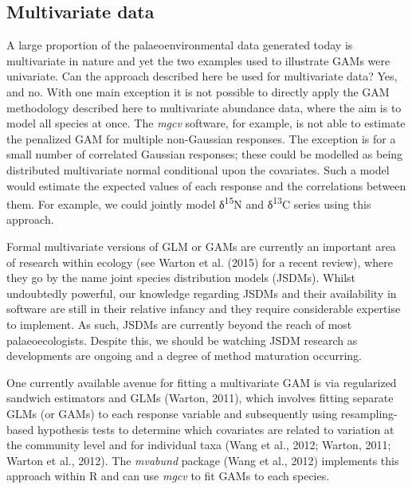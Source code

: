 \documentclass[12pt,]{article}
\begin{document}
\subsection{Multivariate data}\label{multivariate-data}

A large proportion of the palaeoenvironmental data generated today is
multivariate in nature and yet the two examples used to illustrate GAMs
were univariate. Can the approach described here be used for
multivariate data? Yes, and no. With one main exception it is not
possible to directly apply the GAM methodology described here to
multivariate abundance data, where the aim is to model all species at
once. The \emph{mgcv} software, for example, is not able to estimate the
penalized GAM for multiple non-Gaussian responses. The exception is for
a small number of correlated Gaussian responses; these could be modelled
as being distributed multivariate normal conditional upon the
covariates. Such a model would estimate the expected values of each
response and the correlations between them. For example, we could
jointly model δ\textsuperscript{15}N and δ\textsuperscript{13}C series
using this approach.

Formal multivariate versions of GLM or GAMs are currently an important
area of research within ecology (see Warton et al. (2015) for a recent
review), where they go by the name joint species distribution models
(JSDMs). Whilst undoubtedly powerful, our knowledge regarding JSDMs and
their availability in software are still in their relative infancy and
they require considerable expertise to implement. As such, JSDMs are
currently beyond the reach of most palaeoecologists. Despite this, we
should be watching JSDM research as developments are ongoing and a
degree of method maturation occurring.

One currently available avenue for fitting a multivariate GAM is via
regularized sandwich estimators and GLMs (Warton, 2011), which involves
fitting separate GLMs (or GAMs) to each response variable and
subsequently using resampling-based hypothesis tests to determine which
covariates are related to variation at the community level and for
individual taxa (Wang et al., 2012; Warton, 2011; Warton et al., 2012).
The \emph{mvabund} package (Wang et al., 2012) implements this approach
within R and can use \emph{mgcv} to fit GAMs to each species.
\end{document}
